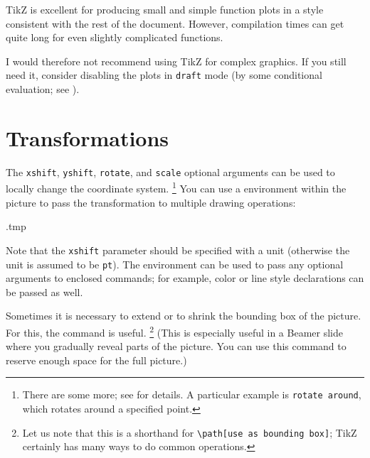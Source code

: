 \begin{practices}
TikZ is excellent for producing small and simple function plots
in a style consistent with the rest of the document.
However, compilation times can get quite long for even slightly complicated functions.

I would therefore not recommend using TikZ for complex graphics.
If you still need it, consider disabling the plots in \verb|draft| mode
(by some conditional evaluation; see ).
\end{practices}



%
%
\section{Transformations}

The \verb|xshift|, \verb|yshift|, \verb|rotate|, and \verb|scale| optional arguments
can be used to locally change the coordinate system.%
\footnote{There are some more; see \cite[Section~25.3]{tikz} for details.
A particular example is \texttt{rotate around}, which rotates around a specified point.}
You can use a  environment within the picture
to pass the transformation to multiple drawing operations:
%
\begin{VerbatimOut}{\jobname.tmp}
\centering
{}
\end{VerbatimOut}
\ShowExampleBelow[2]
%
Note that the \verb|xshift| parameter should be specified with a unit
(otherwise the unit is assumed to be \verb|pt|).
The  environment can be used to pass any optional arguments to enclosed commands;
for example, color or line style declarations can be passed as well.

Sometimes it is necessary to extend or to shrink the bounding box of the picture.
For this, the  command is useful.%
\footnote{Let us note that this is a shorthand for
\texttt{\textbackslash{}path[use as bounding box]};
TikZ certainly has many ways to do common operations.}
(This is especially useful in a Beamer slide where you gradually reveal parts of the picture.
You can use this command to reserve enough space for the full picture.)

